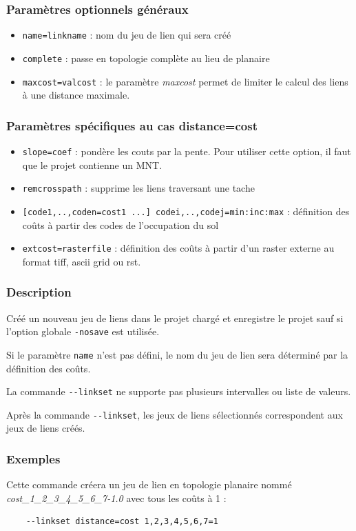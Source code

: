 \documentclass[a4paper,10pt]{report}
\begin{document}
\subsubsection{Paramètres optionnels généraux}
\begin{itemize}
	\item \verb|name=linkname| : nom du jeu de lien qui sera créé
	\item \verb|complete| : passe en topologie complète au lieu de planaire 
	\item \verb|maxcost=valcost| : le paramètre \textit{maxcost} permet de limiter le calcul des liens à une distance maximale.
\end{itemize}

\subsubsection{Paramètres spécifiques au cas distance=cost}
\begin{itemize}
	\item \verb|slope=coef| : pondère les couts par la pente. Pour utiliser cette option, il faut que le projet contienne un MNT.
	\item \verb|remcrosspath| : supprime les liens traversant une tache
	\item \verb|[code1,..,coden=cost1 ...] codei,..,codej=min:inc:max| : définition des coûts à partir des codes de l'occupation du sol
	\item \verb|extcost=rasterfile| : définition des coûts à partir d'un raster externe au format tiff, ascii grid ou rst.
\end{itemize}

\subsubsection{Description}
Créé un nouveau jeu de liens dans le projet chargé et enregistre le projet sauf si l'option globale \verb|-nosave| est utilisée.

Si le paramètre \verb|name| n'est pas défini, le nom du jeu de lien sera déterminé par la définition des coûts.

La commande \verb|--linkset| ne supporte pas plusieurs intervalles ou liste de valeurs.

Après la commande \verb|--linkset|, les jeux de liens sélectionnés correspondent aux jeux de liens créés.

\subsubsection{Exemples}
Cette commande créera un jeu de lien en topologie planaire nommé \textit{cost\_1\_2\_3\_4\_5\_6\_7-1.0} avec tous les coûts à 1 :
\begin{Verbatim}
	--linkset distance=cost 1,2,3,4,5,6,7=1
\end{Verbatim}
\end{document}
